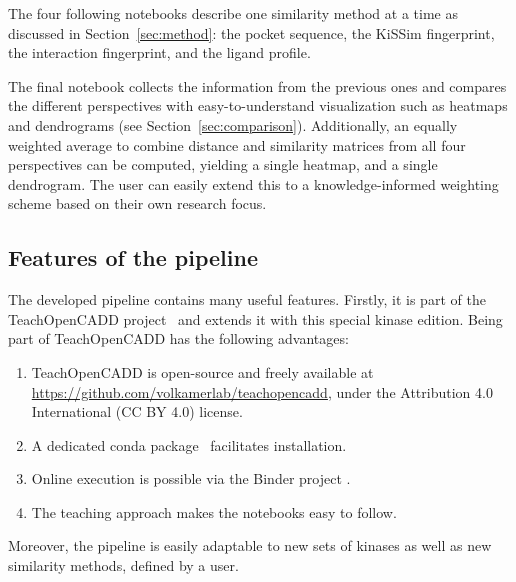\documentclass[9pt,training,ASAPversion]{livecoms}
\begin{document}
The four following notebooks describe one similarity method at a time as discussed in Section~\ref{sec:method}: the pocket sequence, the KiSSim fingerprint, the interaction fingerprint, and the ligand profile.

The final notebook collects the information from the previous ones and compares the different perspectives with easy-to-understand visualization such as heatmaps and dendrograms (see Section~\ref{sec:comparison}). Additionally, an equally weighted average to combine distance and similarity matrices from all four perspectives can be computed, yielding a single heatmap, and a single dendrogram. The user can easily extend this to a knowledge-informed weighting scheme based on their own research focus.

\subsection{Features of the pipeline}
The developed pipeline contains many useful features. Firstly, it is part of the TeachOpenCADD project~\cite{Sydow_2019_JCheminform, sydow_2022_nar} and extends it with this special kinase edition. Being part of TeachOpenCADD has the following advantages:
\begin{enumerate}
    \item TeachOpenCADD is open-source and freely available at \href{https://github.com/volkamerlab/teachopencadd}{https://github.com/volkamerlab/teachopencadd}, under the Attribution 4.0 International (CC BY 4.0) license.
    \item A dedicated conda package~\cite{conda_forge} facilitates installation.
    \item Online execution is possible via the Binder project \cite{binder_2018}.
    \item The teaching approach makes the notebooks easy to follow.
\end{enumerate}
Moreover, the pipeline is easily adaptable to new sets of kinases as well as new similarity methods, defined by a user.
\end{document}
